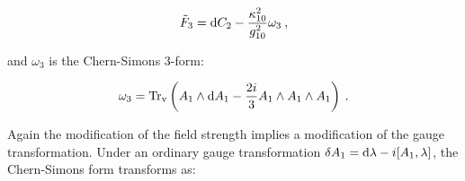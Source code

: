 \begin{equation}
	\tilde{F}_3 = \mathrm{d} C_2 - \frac{\kappa_{10}^2}{g_{10}^2} \omega_3 \:, \label{12.1.35}
\end{equation}

and $\omega_3$ is the Chern-Simons 3-form:

\begin{equation}
	\omega_3 = \operatorname{Tr}_{\text{v}} \left( A_1 \wedge \mathrm{d} A_1 - \frac{2i}{3} A_1 \wedge A_1 \wedge A_1 \right) \:. \label{12.1.36}
\end{equation}

Again the modification of the field strength implies a modification of the gauge transformation. Under an ordinary gauge transformation $\delta A_1 = \mathrm{d} \lambda - i [A_1, \lambda]$, the Chern-Simons form transforms as:

